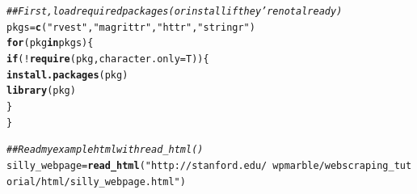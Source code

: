 \documentclass{article}\usepackage[]{graphicx}\usepackage[]{color}
\makeatletter
\newcommand{\hlstr}[1]{\textcolor[rgb]{0.192,0.494,0.8}{#1}}%
\newcommand{\hlcom}[1]{\textcolor[rgb]{0.678,0.584,0.686}{\textit{#1}}}%
\newcommand{\hlopt}[1]{\textcolor[rgb]{0,0,0}{#1}}%
\newcommand{\hlstd}[1]{\textcolor[rgb]{0.345,0.345,0.345}{#1}}%
\newcommand{\hlkwa}[1]{\textcolor[rgb]{0.161,0.373,0.58}{\textbf{#1}}}%
\newcommand{\hlkwb}[1]{\textcolor[rgb]{0.69,0.353,0.396}{#1}}%
\newcommand{\hlkwc}[1]{\textcolor[rgb]{0.333,0.667,0.333}{#1}}%
\newcommand{\hlkwd}[1]{\textcolor[rgb]{0.737,0.353,0.396}{\textbf{#1}}}%
\newenvironment{kframe}{%
 \def\at@end@of@kframe{}%
 \ifinner\ifhmode%
  \def\at@end@of@kframe{\end{minipage}}%
  \begin{minipage}{\columnwidth}%
 \fi\fi%
 \def\FrameCommand##1{\hskip\@totalleftmargin \hskip-\fboxsep
 \colorbox{shadecolor}{##1}\hskip-\fboxsep
     \hskip-\linewidth \hskip-\@totalleftmargin \hskip\columnwidth}%
 \MakeFramed {\advance\hsize-\width
   \@totalleftmargin\z@ \linewidth\hsize
   \@setminipage}}%
 {\par\unskip\endMakeFramed%
 \at@end@of@kframe}
\newenvironment{knitrout}{}{} %
\makeatother
\begin{document}
\begin{knitrout}
\color{fgcolor}\begin{kframe}
\begin{alltt}
\hlcom{## First, load required packages (or install if they're not already)}
\hlstd{pkgs} \hlkwb{=} \hlkwd{c}\hlstd{(}\hlstr{"rvest"}\hlstd{,} \hlstr{"magrittr"}\hlstd{,} \hlstr{"httr"}\hlstd{,} \hlstr{"stringr"}\hlstd{)}
\hlkwa{for} \hlstd{(pkg} \hlkwa{in} \hlstd{pkgs)\{}
  \hlkwa{if} \hlstd{(}\hlopt{!}\hlkwd{require}\hlstd{(pkg,} \hlkwc{character.only} \hlstd{= T))\{}
    \hlkwd{install.packages}\hlstd{(pkg)}
    \hlkwd{library}\hlstd{(pkg)}
  \hlstd{\}}
\hlstd{\}}
\end{alltt}
\end{kframe}
\end{knitrout}
\begin{knitrout}
\color{fgcolor}\begin{kframe}
\begin{alltt}
\hlcom{## Read my example html with read_html()}
\hlstd{silly_webpage} \hlkwb{=} \hlkwd{read_html}\hlstd{(}\hlstr{"http://stanford.edu/~wpmarble/webscraping_tutorial/html/silly_webpage.html"}\hlstd{)}


\end{alltt}
\end{kframe}
\end{knitrout}
\end{document}
